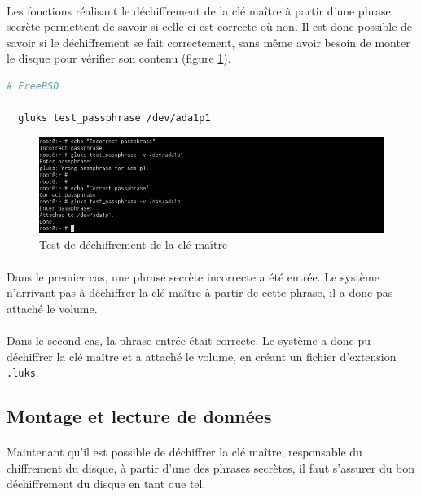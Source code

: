 \paragraph{}
Les fonctions réalisant le déchiffrement de la clé maître à partir d'une phrase
secrète permettent de savoir si celle-ci est correcte où non. Il est donc
possible de savoir si le déchiffrement se fait correctement, sans même avoir
besoin de monter le disque pour vérifier son contenu (figure
\ref{fig:freebsd_test_passphrase}).
\\
\begin{lstlisting}[language=bash]
  # FreeBSD

  gluks test_passphrase /dev/ada1p1
\end{lstlisting}
\begin{figure}[H]
  \centering
  \includegraphics[width=\linewidth]{tests/freebsd_test_passphrase.png}
  \caption{\label{fig:freebsd_test_passphrase}Test de déchiffrement de la clé maître}
\end{figure}
\paragraph{}
Dans le premier cas, une phrase secrète incorrecte a été entrée. Le système
n'arrivant pas à déchiffrer la clé maître à partir de cette phrase, il a donc
pas attaché le volume.
\paragraph{}
Dans le second cas, la phrase entrée était correcte. Le système a donc pu
déchiffrer la clé maître et a attaché le volume, en créant un fichier
d'extension \texttt{.luks}.

\subsection{Montage et lecture de données}
\paragraph{}
Maintenant qu'il est possible de déchiffrer la clé maître, responsable du
chiffrement du disque, à partir d'une des phrases secrètes, il faut s'assurer du
bon déchiffrement du disque en tant que tel.
